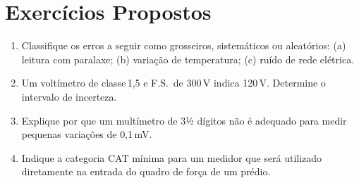 \section{Exercícios Propostos}
\begin{enumerate}
  \item Classifique os erros a seguir como grosseiros, sistemáticos ou aleatórios:  
        (a) leitura com paralaxe; (b) variação de temperatura; (c) ruído de rede elétrica.
  \item Um voltímetro de classe 1,5 e F.S.\ de 300 V indica 120 V. Determine o intervalo de incerteza.
  \item Explique por que um multímetro de 3½ dígitos não é adequado para medir pequenas variações de 0,1 mV.
  \item Indique a categoria CAT mínima para um medidor que será utilizado diretamente na entrada do quadro de força de um prédio.
\end{enumerate}
